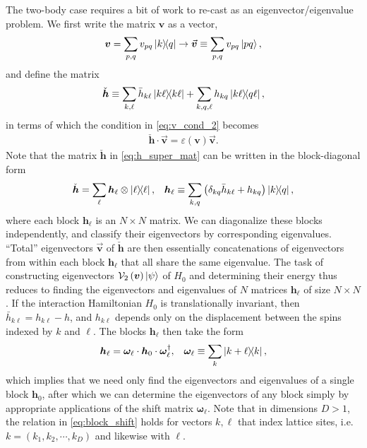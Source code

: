 \documentclass[nofootinbib,notitlepage,11pt]{revtex4-2}
\newcommand{\p}[1]{\left(#1\right)} %
\renewcommand{\c}{\cdot} %
\newcommand{\m}{\bm} %
\renewcommand{\v}{\vec} %
\newcommand{\1}{\mathds{1}}
\newcommand{\e}{\varepsilon}
\newcommand{\V}{\mathcal{V}}
\begin{document}
The two-body case requires a bit of work to re-cast as an
eigenvector/eigenvalue problem.  We first write the matrix $\m v$ as a
vector,
\begin{align}
  \m v = \sum_{p,q} v_{pq} \op{k}{q}
  \to \v{\m v} \equiv \sum_{p,q} v_{pq} \ket{pq},
\end{align}
and define the matrix
\begin{align}
  \check{\m h}
  \equiv \sum_{k,\ell} \bar h_{k\ell} \op{k\ell}
  + \sum_{k,q,\ell} h_{kq} \op{k\ell}{q\ell},
  \label{eq:h_super_mat}
\end{align}
in terms of which the condition in \eqref{eq:v_cond_2} becomes
\begin{align}
  \check{\m h} \c \v{\m v} = \e\p{\m v} \v{\m v}.
\end{align}
Note that the matrix $\check{\m h}$ in \eqref{eq:h_super_mat} can be
written in the block-diagonal form
\begin{align}
  \check{\m h} = \sum_\ell \m h_\ell \otimes \op{\ell},
  &&
  \m h_\ell
  \equiv \sum_{k,q}\p{\delta_{kq} \bar h_{k\ell} + h_{kq}} \op{k}{q},
\end{align}
where each block $\m h_\ell$ is an $N\times N$ matrix.  We can
diagonalize these blocks independently, and classify their
eigenvectors by corresponding eigenvalues.  ``Total'' eigenvectors
$\v{\m v}$ of $\check{\m h}$ are then essentially concatenations of
eigenvectors from within each block $\m h_\ell$ that all share the
same eigenvalue.  The task of constructing eigenvectors
$\V_2\p{\m v}\ket\psi$ of $H_0$ and determining their energy thus
reduces to finding the eigenvectors and eigenvalues of $N$ matrices
$\m h_\ell$ of size $N\times N$.  If the interaction Hamiltonian $H_0$
is translationally invariant, then $\bar h_{k\ell}=h_{k\ell}-h$, and
$h_{k\ell}$ depends only on the displacement between the spins indexed
by $k$ and $\ell$.  The blocks $\m h_\ell$ then take the form
\begin{align}
  \m h_{\ell} = \m\omega_\ell \c \m h_0 \c \m\omega_\ell^\dag,
  &&
  \m\omega_\ell \equiv \sum_k \op{k+\ell}{k},
  \label{eq:block_shift}
\end{align}
which implies that we need only find the eigenvectors and eigenvalues
of a single block $\m h_0$, after which we can determine the
eigenvectors of any block simply by appropriate applications of the
shift matrix $\m\omega_\ell$.  Note that in dimensions $D>1$, the
relation in \eqref{eq:block_shift} holds for vectors $k,\ell$ that
index lattice sites, i.e.~$k=\p{k_1,k_2,\cdots,k_D}$ and likewise with
$\ell$.


\end{document}
